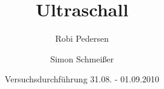 \documentclass[a4paper,oneside]{scrartcl} %
\title{Ultraschall}
\author{Robi Pedersen \and Simon Schmeißer}
\date{Versuchsdurchführung 31.08. - 01.09.2010}
\begin{document}
\begin{titlepage}
  \maketitle
  \vfill
  \thispagestyle{empty}
\end{titlepage}

\tableofcontents
\clearpage









 

\end{document}
